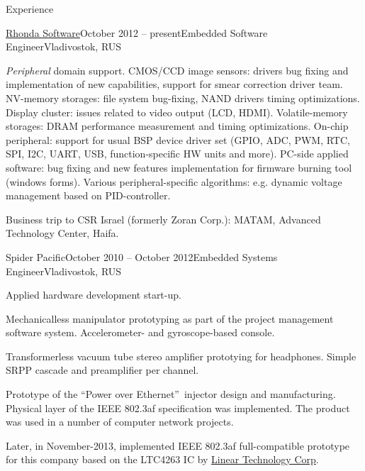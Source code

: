 \documentclass{template}
\begin{document}
\begin{rSection}{Experience}
\begin{rCompany}{\href{http://www.rhondasoftware.com}{Rhonda Software}}{October 2012 -- present}{Embedded Software Engineer}{Vladivostok, RUS}
\item \textit{Peripheral} domain support. CMOS/CCD image sensors: drivers bug fixing and implementation of new capabilities, support for smear correction driver team. NV-memory storages: file system bug-fixing, NAND drivers timing optimizations. Display cluster: issues related to video output (LCD, HDMI). Volatile-memory storages: DRAM performance measurement and timing optimizations. On-chip peripheral: support for usual BSP device driver set (GPIO, ADC, PWM, RTC, SPI, I2C, UART, USB, function-specific HW units and more). PC-side applied software: bug fixing and new features implementation for firmware burning tool (windows forms). Various peripheral-specific algorithms: e.g. dynamic voltage management based on PID-controller.
\item Business trip to CSR Israel (formerly Zoran Corp.): MATAM, Advanced Technology Center, Haifa. \newline
\end{rCompany}
\begin{rCompany}{Spider Pacific}{October 2010 -- October 2012}{Embedded Systems Engineer}{Vladivostok, RUS}
\item Applied hardware development start-up.
\item Mechanicalless manipulator prototyping as part of the project management software system. \newline Accelerometer- and gyroscope-based console.
\item Transformerless vacuum tube stereo amplifier prototying for headphones. \newline Simple SRPP cascade and preamplifier per channel.
\item Prototype of the \textquotedblleft Power over Ethernet\textquotedblright \ injector design and manufacturing. Physical layer of the IEEE 802.3af specification was implemented. The product was used in a number of computer network projects.
\item Later, in November-2013, implemented IEEE 802.3af full-compatible prototype for this company based on the LTC4263 IC by \href{http://www.linear.com}{Linear Technology Corp}.
\end{rCompany}
\end{rSection}

\end{document}
